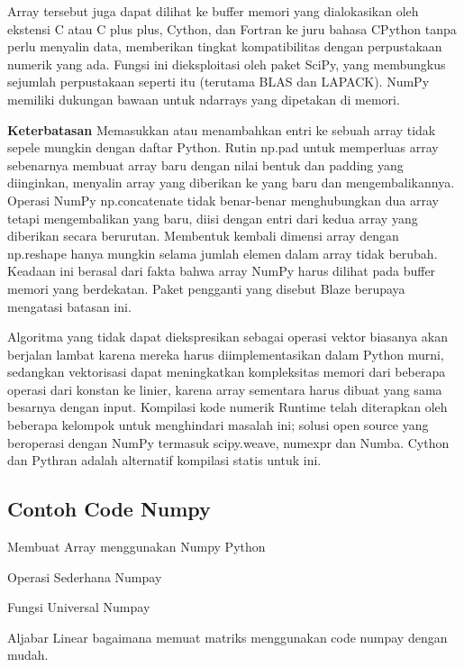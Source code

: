 Array tersebut juga dapat dilihat ke buffer memori yang dialokasikan oleh ekstensi C atau C plus plus, Cython, dan Fortran ke juru bahasa CPython tanpa perlu menyalin data, memberikan tingkat kompatibilitas dengan perpustakaan numerik yang ada. Fungsi ini dieksploitasi oleh paket SciPy, yang membungkus sejumlah perpustakaan seperti itu (terutama BLAS dan LAPACK). NumPy memiliki dukungan bawaan untuk ndarrays yang dipetakan di memori.

\textbf{Keterbatasan}
\newline
Memasukkan atau menambahkan entri ke sebuah array tidak sepele mungkin dengan daftar Python. Rutin np.pad untuk memperluas array sebenarnya membuat array baru dengan nilai bentuk dan padding yang diinginkan, menyalin array yang diberikan ke yang baru dan mengembalikannya. Operasi NumPy np.concatenate tidak benar-benar menghubungkan dua array tetapi mengembalikan yang baru, diisi dengan entri dari kedua array yang diberikan secara berurutan. Membentuk kembali dimensi array dengan np.reshape hanya mungkin selama jumlah elemen dalam array tidak berubah. Keadaan ini berasal dari fakta bahwa array NumPy harus dilihat pada buffer memori yang berdekatan. Paket pengganti yang disebut Blaze berupaya mengatasi batasan ini. 

Algoritma yang tidak dapat diekspresikan sebagai operasi vektor biasanya akan berjalan lambat karena mereka harus diimplementasikan dalam Python murni, sedangkan vektorisasi dapat meningkatkan kompleksitas memori dari beberapa operasi dari konstan ke linier, karena array sementara harus dibuat yang sama besarnya dengan input. Kompilasi kode numerik Runtime telah diterapkan oleh beberapa kelompok untuk menghindari masalah ini; solusi open source yang beroperasi dengan NumPy termasuk scipy.weave, numexpr dan Numba. Cython dan Pythran adalah alternatif kompilasi statis untuk ini.

\newpage
\subsection{Contoh Code Numpy}
Membuat Array menggunakan Numpy Python


Operasi Sederhana Numpay


Fungsi Universal Numpay


Aljabar Linear bagaimana memuat matriks menggunakan code numpay dengan mudah.


